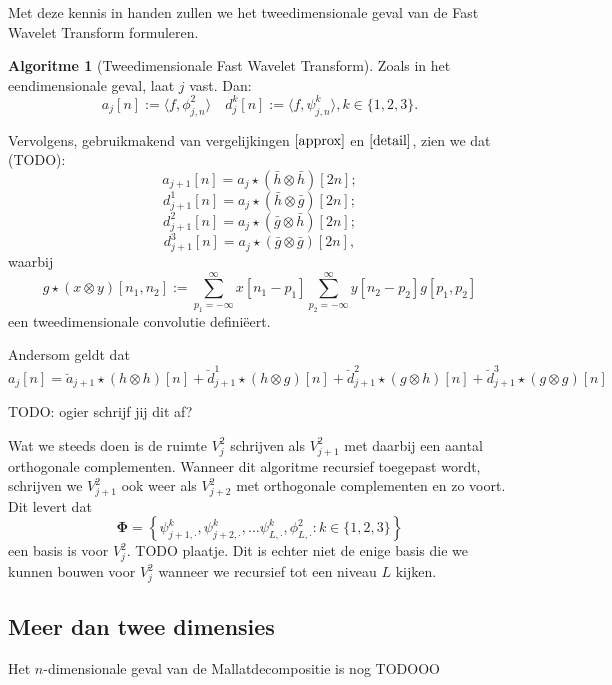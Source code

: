 \documentclass[11pt]{report}
\theoremstyle{plain}
\theoremstyle{definition}
\newtheorem{algoritme}{Algoritme}
\theoremstyle{remark}
\begin{document}
Met deze kennis in handen zullen we het tweedimensionale geval van de Fast Wavelet Transform formuleren.
\begin{algoritme}[Tweedimensionale Fast Wavelet Transform]
Zoals in het eendimensionale geval, laat $j$ vast. Dan:
\[
	a_j[n] := \langle f, \phi^2_{j,n} \rangle \quad d^k_j[n] := \langle f, \psi^k_{j,n} \rangle , k \in \{1,2,3\}.
\]

Vervolgens, gebruikmakend van vergelijkingen $\ref{approx}$ en $\ref{detail}$, zien we dat (TODO):
\[
	a_{j+1}[n] = a_j \star (\bar{h} \otimes \bar{h})[2n];
\]
\[
	d^1_{j+1}[n] = a_j \star (\bar{h} \otimes \bar{g})[2n];
\]
\[
	d^2_{j+1}[n] = a_j \star (\bar{g} \otimes \bar{h})[2n];
\]
\[
	d^3_{j+1}[n] = a_j \star (\bar{g} \otimes \bar{g})[2n],
\]
waarbij
\[
	g \star (x \otimes y)[n_1,n_2] := \sum_{p_1=-\infty}^\infty x[n_1 - p_1] \sum_{p_2 = -\infty}^\infty y[n_2 - p_2] g[p_1, p_2]
\]
een tweedimensionale convolutie defini\"eert.

Andersom geldt dat
\[
a_j[n] = \breve{a}_{j+1} \star (h \otimes h)[n] + \breve{d}_{j+1}^1 \star (h \otimes g)[n] + \breve{d}_{j+1}^2 \star (g \otimes h)[n] + \breve{d}_{j+1}^3 \star (g \otimes g)[n]
\]
\end{algoritme}

TODO: ogier schrijf jij dit af?

Wat we steeds doen is de ruimte $V_j^2$ schrijven als $V_{j+1}^2$ met daarbij een aantal orthogonale complementen. Wanneer dit algoritme recursief toegepast wordt, schrijven we $V_{j+1}^2$ ook weer als $V_{j+2}^2$ met orthogonale complementen en zo voort. Dit levert dat
\[
	\boldsymbol\Phi = \left\{ \psi^k_{j+1,\cdot}, \psi^k_{j+2,\cdot}, \ldots \psi^k_{L,\cdot}, \phi^2_{L,\cdot}: k \in \{1,2,3\} \right\}
\]
een basis is voor $V_j^2$. TODO plaatje. Dit is echter niet de enige basis die we kunnen bouwen voor $V_j^2$ wanneer we recursief tot een niveau $L$ kijken.

\subsection{Meer dan twee dimensies}
Het $n$-dimensionale geval van de Mallatdecompositie is nog TODOOO
\end{document}
